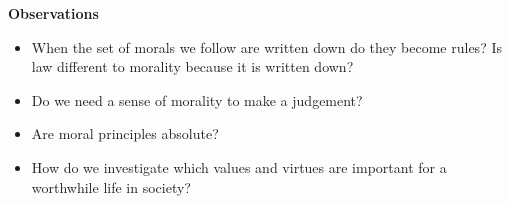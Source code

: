 \documentclass[11pt, oneside]{article}   	%
\begin{document}
\par \textbf{Observations}
\begin{itemize}
	\item When the set of morals we follow are written down do they become rules? Is law different to morality because it is written down?
	\item Do we need a sense of morality to make a judgement?
	\item Are moral principles absolute?
	\item How do we investigate which values and virtues are important for a worthwhile life in society?
\end{itemize}
\end{document}
